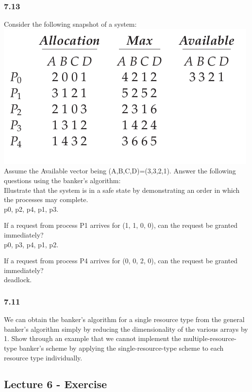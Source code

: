 \documentclass[a4paper,10pt,titlepage]{report}
\begin{document}
\subsubsection{7.13} Consider the following snapshot of a system: \\
\includegraphics[scale=0.5]{ex-7_13.png} \\
Assume the Available vector being (A,B,C,D)=(3,3,2,1). Answer the following questions using the banker's algorithm:\\

Illustrate that the system is in a safe state by demonstrating an order in which the processes may complete.\\
p0, p2, p4, p1, p3.

If a request from process P1 arrives for (1, 1, 0, 0), can the request be granted immediately?\\
p0, p3, p4, p1, p2.

If a request from process P4 arrives for (0, 0, 2, 0), can the request be granted immediately?\\
deadlock.

\subsubsection{7.11} We can obtain the banker's algorithm for a single resource type from the general banker's algorithm simply by reducing the dimensionality of the various arrays by 1. Show through an example that we cannot implement the multiple-resource-type banker's scheme by applying the single-resource-type scheme to each resource type individually.



\newpage
\subsection{Lecture 6 - Exercise}
\end{document}
